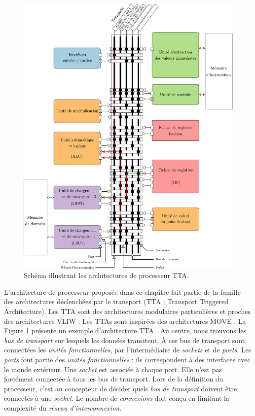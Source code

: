 \begin{figure}[htp]
\centering
\includegraphics[width=\textwidth]{main/ch4_fig/archi_tta}
\caption{Schéma illustrant les architectures de processeur TTA.}
\label{fig:tta_example}
\end{figure}



L'architecture de processeur proposée dans ce chapitre fait partie de la famille des architectures déclenchées par le transport (TTA : Transport Triggered Architecture). Les TTA sont des architectures modulaires particulières et proches des architectures VLIW \cite{corporaal_microprocessor_1997}. Les TTAs sont inspirées des architectures MOVE \cite{1051344}. La Figure \ref{fig:tta_example} présente un exemple d'architecture TTA \cite{pekka_phd_2012}. Au centre, nous trouvons les \textit{bus de transport} sur lesquels les données transitent. \`A ces bus de transport sont connectées les \textit{unités fonctionnelles}, par l'intermédiaire de \textit{sockets} et de \textit{ports}. Les \textit{ports} font partie des \textit{unités fonctionnelles} : ils correspondent à des interfaces avec le monde extérieur. Une \textit{socket} est associée à chaque port. Elle n'est pas forcément connectée à tous les bus de transport. Lors de la définition du processeur, c'est au concepteur de décider quels \textit{bus de transport} doivent être connectés à une \textit{socket}. Le nombre de \textit{connexions} doit conçu en limitant la complexité du \textit{réseau d'interconnexion}.

